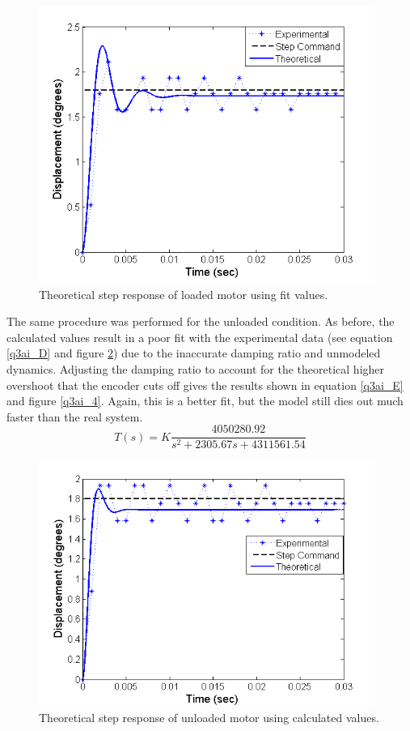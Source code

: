 \documentclass{article}
\theoremstyle{plain}
\theoremstyle{definition}
\theoremstyle{remark}
\begin{document}
\begin{figure}[hbt]
\begin{center}
\includegraphics[width = 11cm]{LoadedStepFit.png}
\caption{Theoretical step response of loaded motor using fit values.}
\label{q3ai_2}
\end{center}
\end{figure}
\vspace{5mm}
The same procedure was performed for the unloaded condition. As before, the calculated values result in a poor fit with the experimental data (see equation \ref{q3ai_D} and figure \ref{q3ai_3})  due to the inaccurate damping ratio and unmodeled dynamics. Adjusting the damping ratio to account for the theoretical higher overshoot that the encoder cuts off gives the results shown in equation \ref{q3ai_E} and figure \ref{q3ai_4}. Again, this is a better fit, but the model still dies out much faster than the real system.\\

\begin{equation}
\label{q3ai_D}
T(s) = K \frac{4050280.92}{s^2 + 2305.67 s + 4311561.54}
\end{equation}

\begin{figure}[hbt]
\begin{center}
\includegraphics[width = 11cm]{UnloadedStepUnFit.png}
\caption{Theoretical step response of unloaded motor using calculated values.}
\label{q3ai_3}
\end{center}
\end{figure}
\end{document}
